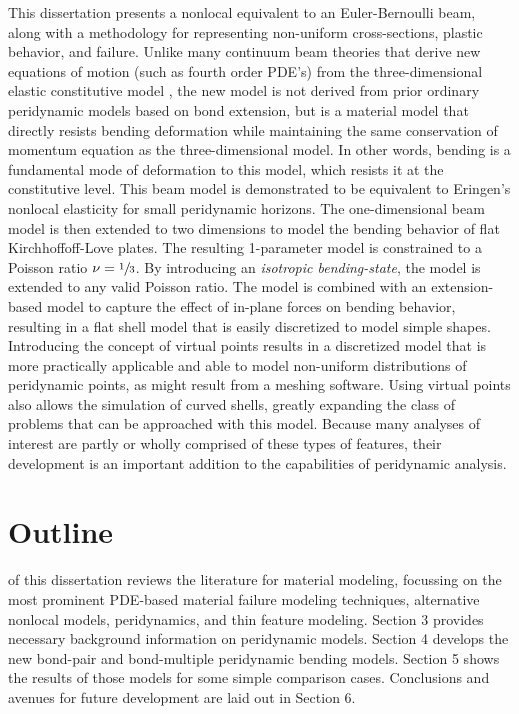 This dissertation presents a nonlocal equivalent to an Euler-Bernoulli beam, along with a methodology for representing non-uniform cross-sections, plastic behavior, and failure.
Unlike many continuum beam theories that derive new equations of motion (such as fourth order PDE's) from the three-dimensional elastic constitutive model , the new model is not derived from prior ordinary peridynamic models based on bond extension, but is a material model that directly resists bending deformation while maintaining the same conservation of momentum equation as the three-dimensional model.
In other words, bending is a fundamental mode of deformation to this model, which resists it at the constitutive level.
This beam model is demonstrated to be equivalent to Eringen's nonlocal elasticity for small peridynamic horizons.
The one-dimensional beam model is then extended to two dimensions to model the bending behavior of flat Kirchhoffoff-Love plates.
The resulting 1-parameter model is constrained to a Poisson ratio \(\nu=\sfrac{1}{3}\).  
By introducing an \emph{isotropic bending-state}, the model is extended to any valid Poisson ratio.  
The model is combined with an extension-based model to capture the effect of in-plane forces on bending behavior, resulting in a flat shell model that is easily discretized to model simple shapes.
Introducing the concept of virtual points results in a discretized model that is more practically applicable and able to model non-uniform distributions of peridynamic points, as might result from a meshing software.
Using virtual points also allows the simulation of curved shells, greatly expanding the class of problems that can be approached with this model.
Because many analyses of interest are partly or wholly comprised of these types of features, their development is an important addition to the capabilities of peridynamic analysis.

\section{Outline}

 of this dissertation reviews the literature for material modeling, focussing on the most prominent PDE-based material failure modeling techniques, alternative nonlocal models, peridynamics, and thin feature modeling. Section 3  provides necessary background information on peridynamic models. Section 4  develops the new bond-pair and bond-multiple peridynamic bending models. Section 5 shows the results of those models for some simple comparison cases. Conclusions and avenues for future development are laid out in Section 6. 
